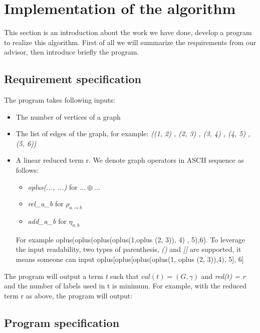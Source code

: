 \documentclass[a4paper, 12pt]{article}
\begin{document}
\section {Implementation of the algorithm}
This section is an introduction about the work we have done, develop a program to realize this algorithm. First of all we will summarize the requirements from our advisor, then introduce briefly the program.

\subsection{Requirement specification}

The program takes following inputs: 
\begin{itemize}
\item The number of vertices of a graph
\item The list of edges of the graph, for example: \textit {((1, 2) , (2, 3) , (3, 4) , (4, 5) , (5, 6))}
\item A linear reduced term r. We denote graph operators in ASCII sequence as follows:
\begin{itemize}
\item \textit {oplus(..., ...)} for $...\oplus...$
\item \textit {rel\_a\_b} for $\rho_{a\rightarrow b}$
\item \textit {add\_a\_b} for $\eta_{a,b}$
\end{itemize}

For example\textit { }oplus(oplus(oplus(oplus(1,oplus (2, 3)), 4) , 5),6). To leverage the input readability, two types of parenthesis, \textit {()} and \textit {{[}{]}} are supported, it means someone can input oplus{[}oplus{[}oplus(oplus(1, oplus (2, 3)),4), 5{]}, 6{]}
\end{itemize}
The program will output a term \textit t such that \textit {$val(t)=(G,\gamma)$} and \textit {red(t) = r} and the number of labels used in t is minimum. For example, with the reduced term r as above, the program will output: \textit{}


\subsection{Program specification}
\end{document}
